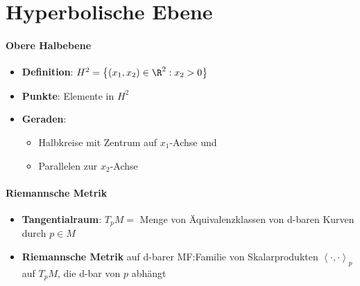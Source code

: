 \section{Hyperbolische Ebene}

\paragraph{Obere Halbebene}
\begin{itemize}
  \item \textbf{Definition}: \( H^2 = \left \{ (x_1,x_2) \in \R^2 : x_2 > 0 \right \} \)
  \item \textbf{Punkte}: Elemente in \( H^2 \)
  \item \textbf{Geraden}:
  \begin{itemize}
    \item Halbkreise mit Zentrum auf \( x_1 \)-Achse und
    \item Parallelen zur \( x_2 \)-Achse
  \end{itemize}
\end{itemize}

\paragraph{Riemannsche Metrik}
\begin{itemize}
  \item \textbf{Tangentialraum}: \( T_p M = \) Menge von Äquivalenzklassen von d-baren Kurven durch \( p \in M \)
  \item \textbf{Riemannsche Metrik} auf d-barer MF:\@ Familie von Skalarprodukten \( \left\langle \cdot, \cdot \right\rangle_p \) auf \( T_p M \), die d-bar von \( p \) abhängt
\end{itemize}

